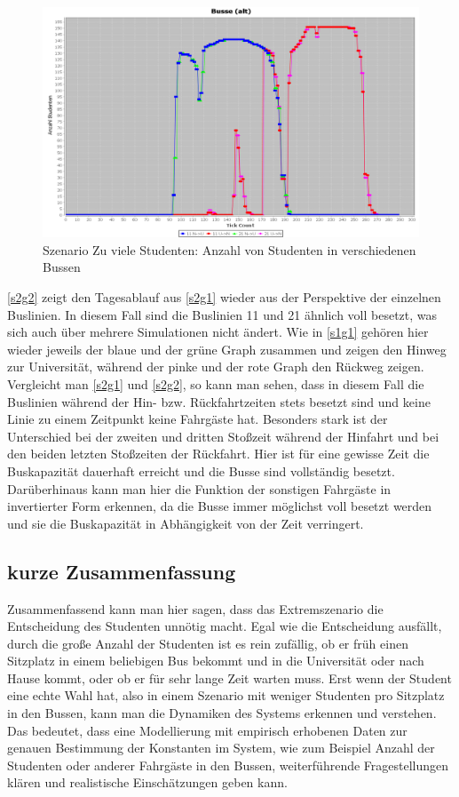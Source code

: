 \documentclass[12pt,a4paper]{scrartcl}
\begin{document}
\begin{figure}
\includegraphics[scale=0.4]{Viele_Studenten_Busse.png}
\caption{Szenario \glqq Zu viele Studenten\grqq : Anzahl von Studenten in verschiedenen Bussen}
\label{s2g2}
\end{figure}

\autoref{s2g2} zeigt den Tagesablauf aus \autoref{s2g1} wieder aus der Perspektive der einzelnen Buslinien. In diesem Fall sind die Buslinien 11 und 21 ähnlich voll besetzt, was sich auch über mehrere Simulationen nicht ändert. Wie in \autoref{s1g1} gehören hier wieder jeweils der blaue und der grüne Graph zusammen und zeigen den Hinweg zur Universität, während der pinke und der rote Graph den Rückweg zeigen. Vergleicht man \autoref{s2g1} und \autoref{s2g2}, so kann man sehen, dass in diesem Fall die Buslinien während der Hin- bzw. Rückfahrtzeiten stets besetzt sind und keine Linie zu einem Zeitpunkt keine Fahrgäste hat. Besonders stark ist der Unterschied bei der zweiten und dritten Stoßzeit während der Hinfahrt und bei den beiden letzten Stoßzeiten der Rückfahrt. Hier ist für eine gewisse Zeit die Buskapazität dauerhaft erreicht und die Busse sind vollständig besetzt. Darüberhinaus kann man hier die Funktion der sonstigen Fahrgäste in invertierter Form erkennen, da die Busse immer möglichst voll besetzt werden und sie die Buskapazität in Abhängigkeit von der Zeit verringert.


\subsection{kurze Zusammenfassung}\label{graphenzsm}
Zusammenfassend kann man hier sagen, dass das Extremszenario die Entscheidung des Studenten unnötig macht. Egal wie die Entscheidung ausfällt, durch die große Anzahl der Studenten ist es rein zufällig, ob er früh einen Sitzplatz in einem beliebigen Bus bekommt und in die Universität oder nach Hause kommt, oder ob er für sehr lange Zeit warten muss. Erst wenn der Student eine echte Wahl hat, also in einem Szenario mit weniger Studenten pro Sitzplatz in den Bussen, kann man die Dynamiken des Systems erkennen und verstehen. Das bedeutet, dass eine Modellierung mit empirisch erhobenen Daten zur genauen Bestimmung der Konstanten im System, wie zum Beispiel Anzahl der Studenten oder anderer Fahrgäste in den Bussen, weiterführende Fragestellungen klären und realistische Einschätzungen geben kann.
\end{document}
